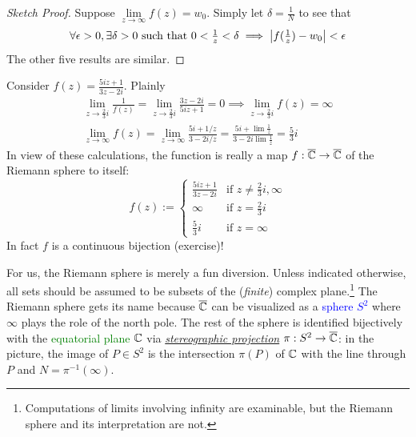 \begin{proof}[Sketch Proof]
Suppose $\lim\limits_{z\to\infty}f(z)=w_0$. Simply let $\delta=\frac 1N$ to see that
\[\forall \epsilon>0,\exists \delta>0\text{ such that }0<\tfrac 1z<\delta \implies \left| f(\tfrac 1z)-w_0\right|<\epsilon\]
The other five results are similar.
\end{proof}\goodbreak

\begin{example}{}{}
Consider $f(z)=\frac{5iz+1}{3z-2i}$. Plainly 
  \begin{gather*}
  \lim_{z\to\frac 23i}\frac 1{f(z)}=\lim_{z\to\frac 23i}\frac{3z-2i}{5iz+1}=0\implies \lim_{z\to\frac 23i}f(z)=\infty\\
  \lim_{z\to\infty}f(z)= \lim_{z\to\infty}\frac{5i+1/z}{3-2i/z} = \frac{5i+\lim\frac 1z}{3-2i\lim\frac 1z}=\frac 53i
  \end{gather*}
In view of these calculations, the function is really a map $f:\overline{\mathbb{C}}\to\overline{\mathbb{C}}$ of the Riemann sphere to itself:
\[f(z):=\begin{cases}
\frac{5iz+1}{3z-2i}&\text{if }z\neq \frac 23i,\infty\\
\infty&\text{if }z=\frac 23i\\
\frac 53i&\text{if }z=\infty
\end{cases}\]
In fact $f$ is a continuous bijection (exercise)!
\end{example}

For us, the Riemann sphere is merely a fun diversion. Unless indicated otherwise, all sets should be assumed to be subsets of the (\emph{finite}) complex plane.\footnote{Computations of limits involving infinity are examinable, but the Riemann sphere and its interpretation are not.} The Riemann sphere gets its name because $\overline{\mathbb{C}}$ can be visualized as a \textcolor{blue}{sphere $S^2$} where $\infty$ plays the role of the north pole. The rest of the sphere is identified bijectively with the \textcolor{Green}{equatorial plane $\mathbb{C}$} via \href{https://en.wikipedia.org/wiki/Stereographic_projection}{\emph{stereographic projection}} $\pi:S^2\to\overline{\mathbb{C}}$: in the picture, the image of $P\in S^2$ is the intersection $\pi(P)$ of $\mathbb{C}$ with the line through $P$ and $N=\pi^{-1}(\infty)$.

